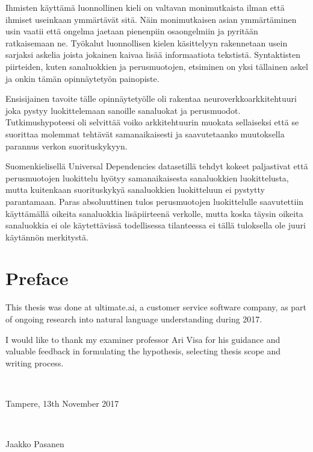 \documentclass[12pt,a4paper,english
]{tutthesis}
\begin{document}
\begin{otherlanguage}{finnish}
Ihmisten käyttämä luonnollinen kieli on valtavan monimutkaista ilman että ihmiset useinkaan ymmärtävät sitä. Näin monimutkaisen asian ymmärtäminen usin vaatii että ongelma jaetaan pienenpiin osaongelmiin ja pyritään ratkaisemaan ne. Työkalut luonnollisen kielen käsittelyyn rakennetaan usein sarjaksi askelia joista jokainen kaivaa lisää informaatiota tekstistä. Syntaktisten piirteiden, kuten sanaluokkien ja perusmuotojen, etsiminen on yksi tällainen askel ja onkin tämän opinnäytetyön painopiste.

Ensisijainen tavoite tälle opinnäytetyölle oli rakentaa neuroverkkoarkkitehtuuri joka pystyy luokittelemaan sanoille sanaluokat ja perusmuodot. Tutkimushypoteesi oli selvittää voiko arkkitehtuurin muokata sellaiseksi että se suorittaa molemmat tehtävät samanaikaisesti ja saavutetaanko muutoksella parannus verkon suorituskykyyn.

Suomenkielisellä Universal Dependencies datasetillä tehdyt kokeet paljastivat että perusmuotojen luokittelu hyötyy samanaikaisesta sanaluokkien luokittelusta, mutta kuitenkaan suorituskykyä sanaluokkien luokitteluun ei pystytty parantamaan. Paras absoluuttinen tulos perusmuotojen luokittelulle saavutettiin käyttämällä oikeita sanaluokkia lisäpiirteenä verkolle, mutta koska täysin oikeita sanaluokkia ei ole käytettävissä todellisessa tilanteessa ei tällä tuloksella ole juuri käytännön merkitystä.



\end{otherlanguage} %


\chapter*{Preface}

This thesis was done at ultimate.ai, a customer service software company, as part of ongoing research into natural language understanding during 2017.

I would like to thank my examiner professor Ari Visa for his guidance and valuable feedback in formulating the hypothesis, selecting thesis scope and writing process.

~ 

Tampere, 13th November 2017

~

Jaakko Pasanen


\end{document}
